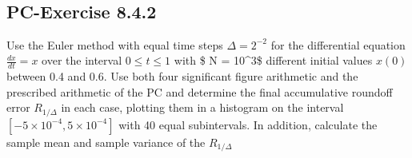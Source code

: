 \documentclass[a4paper,dvipdfmx]{jsarticle}
\newlength{\cellleftmargin}
\newlength{\smallerfontscale}
\def\smaller{\fontsize{\smallerfontscale}{\smallerfontscale}\selectfont}
\begin{document}
\par\vspace{1\smallerfontscale}%
    \begin{addmargin}[\cellleftmargin]{0em}%
    {\smaller%
    \vspace{-1\smallerfontscale}%
    
    \begin{center}
    \end{center}
    { \hspace*{\fill} \\}
    }%
    \end{addmargin}%
    \subsection{PC-Exercise 8.4.2}\label{pc-exercise-8.4.2}

Use the Euler method with equal time steps \(\Delta = 2^{-2}\) for the
differential equation \(\frac{dx}{dt} = x\) over the interval
\(0 \le t \le 1\) with \$ N = 10\^{}3\$ different initial values
\(x(0)\) between 0.4 and 0.6. Use both four significant figure
arithmetic and the prescribed arithmetic of the PC and determine the
final accumulative roundoff error \(R_{1/\Delta}\) in each case,
plotting them in a histogram on the interval
\([-5 \times 10^{-4} , 5\times 10^{-4}]\) with 40 equal subintervals. In
addition, calculate the sample mean and sample variance of the
\(R_{1/\Delta}\)

\end{document}
